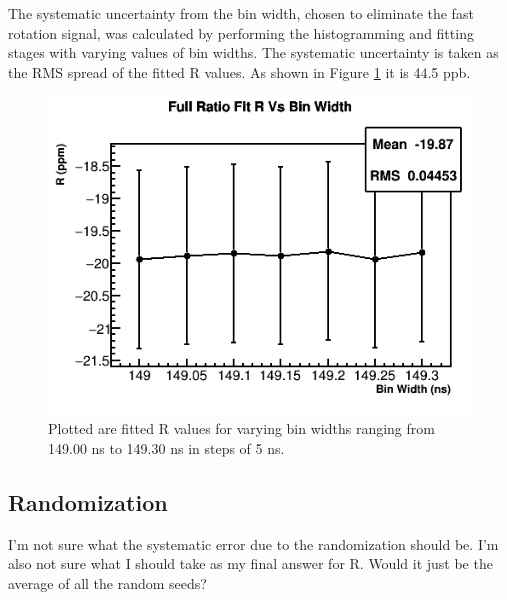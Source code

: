 The systematic uncertainty from the bin width, chosen to eliminate the fast rotation signal, was calculated by performing the histogramming and fitting stages with varying values of bin widths. The systematic uncertainty is taken as the RMS spread of the fitted R values. As shown in Figure \ref{fig:BinWidth} it is 44.5 ppb.

\begin{figure}[]
	\centering
	\includegraphics[width=.6\textwidth]{BinWidthComparison}
    \caption[BinWidth]{Plotted are fitted R values for varying bin widths ranging from 149.00 ns to 149.30 ns in steps of 5 ns.}
    \label{fig:BinWidth}
\end{figure}

\subsection{Randomization}

I'm not sure what the systematic error due to the randomization should be. I'm also not sure what I should take as my final answer for R. Would it just be the average of all the random seeds?

